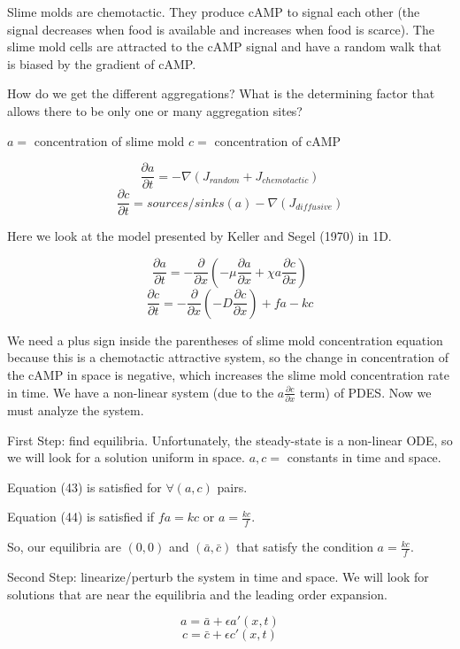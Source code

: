 \documentclass[]{article}
\numberwithin{equation}{section}		%
\begin{document}
Slime molds are chemotactic.  They produce cAMP to signal each other (the signal decreases when food is available and increases when food is scarce). The slime mold cells are attracted to the cAMP signal and have a random walk that is biased by the gradient of cAMP.

How do we get the different aggregations? What is the determining factor that allows there to be only one or many aggregation sites?

$a=$ concentration of slime mold
$c=$ concentration of cAMP

$$\frac{\partial a}{\partial t}=-\nabla(J_{random}+J_{chemotactic})$$
$$\frac{\partial c}{\partial t}=sources/sinks(a)-\nabla(J_{diffusive})$$

\indent Here we look at the model presented by Keller and Segel (1970) in 1D.

\begin{equation}
\frac{\partial a}{\partial t}=-\frac{\partial}{\partial x}(-\mu\frac{\partial a}{\partial x}+\chi a\frac{\partial c}{\partial x})
\end{equation}
\begin{equation}
    \frac{\partial c}{\partial t}=-\frac{\partial}{\partial x}(-D\frac{\partial c}{\partial x})+fa-kc
\end{equation}

\indent We need a plus sign inside the parentheses of slime mold concentration equation because this is a chemotactic attractive system, so the change in concentration of the cAMP in space is negative, which increases the slime mold concentration rate in time. We have a non-linear system (due to the $a\frac{\partial c}{\partial x}$ term) of PDES.  Now we must analyze the system.

\indent First Step: find equilibria. Unfortunately, the steady-state is a non-linear ODE, so we will look for a solution uniform in space. $a,c =$ constants in time and space.

\indent\indent Equation (43) is satisfied for $\forall(a,c)$ pairs.

\indent\indent Equation (44) is satisfied if $fa=kc$ or $a=\frac{kc}{f}$.

So, our equilibria are $(0,0)$ and $(\bar{a},\bar{c})$ that satisfy the condition $a=\frac{kc}{f}$.

\noindent Second Step: linearize/perturb the system in time and space.  We will look for solutions that are near the equilibria and the leading order expansion.

$$a=\bar{a}+\epsilon a'(x,t)$$
$$c=\bar{c}+\epsilon c'(x,t)$$
\end{document}
